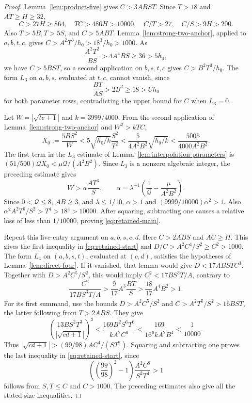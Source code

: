 \documentclass[12pt]{article}
\numberwithin{equation}{section}
\begin{document}
\begin{proof}
Lemma~\ref{lem:product-five} gives \(C>3ABST\). Since \(T>18\) and \(AT\ge H\ge32\),
\[
 C>27H\ge864,\quad TC>486H>10000,\quad
 C/T>27,\quad C/S>9H>200.
\]
Also \(T>5B,T>5S\), and \(C>5ABT\). Lemma~\ref{lem:strong-two-anchor},
applied to \(a,b,t,c\), gives \(C>A^2T^3/h_0>18^3/h_0>1000\).
As
\[
 \frac{A^2T^2}{BS}>4A^4BS\ge36>5h_0,
\]
we have \(C>5BST\), so a second application on \(b,s,t,c\) gives
\(C>B^2T^3/h_0\).
The form \(L_3\) on \(a,b,s\), evaluated at \(t,c\), cannot vanish, since
\[
 \frac{BT}{AS}>2B^2\ge18>Uh_0
\]
for both parameter rows, contradicting the upper bound for \(C\) when \(L_3=0\).

Let \(W=|\sqrt{tc+1}|\) and \(k=3999/4000\). From the second application of Lemma~\ref{lem:strong-two-anchor}
and \(W^2>kTC\),
\[
 X_0:=\frac{5BS^2}{W}
 <5\sqrt{h_0/k}\frac{S^2}{T^2}
 <\frac5{4A^2B^2}\sqrt{h_0/k}
 <\frac{5005}{4000A^2B^2}.
\]
The first term in the \(L_3\) estimate of
Lemma~\ref{lem:interpolation-parameters} is
\((51/500)\mathcal QX_0<\mu\mathcal Q/(A^2B^2)\).
Since \(L_3\) is a nonzero algebraic integer, the preceding estimate gives
\[
 W>\alpha\frac{AT^3}{S},\qquad
 \alpha=\lambda^{-1}\left(\frac1{\mathcal Q}
                              -\frac{\mu}{A^2B^2}\right).
\]
Since \(0<\mathcal Q\le8\), \(AB\ge3\), and \(\lambda\le1/10\),
\(\alpha>1\) and \((9999/10000)\alpha^2>1\).
Also \(\alpha^2A^2T^6/S^2>T^4>18^4>10000\).
After squaring, subtracting one causes a relative loss of less than \(1/10000\),
proving \eqref{eq:retained-main}.

Repeat this five-entry argument on \(a,b,s,c,d\). Here
\(C>2ABS\) and \(AC\ge H\). This gives the first inequality in
\eqref{eq:retained-start} and \(D/C>A^2C^4/S^2\ge C^2>1000\).
The form $L_4$ on $(a,b,s,t)$, evaluated at $(c,d)$, satisfies the hypotheses of Lemma~\ref{lem:direct-four}. If it vanished, that lemma would give $D<17ABSTC^3$. Together with $D>A^2C^5/S^2$, this would imply $C^2<17BS^3T/A$, contrary to
\[
 \frac{C^2}{17BS^3T/A}>
 \frac9{17}A^3\frac{BT}{S}>
 \frac{18}{17}A^4B^2>1.
\]
For its first summand, use the bounds \(D>A^2C^5/S^2\) and
\(C>A^2T^5/S^2>16BST\), the latter following from \(T>2ABS\).
They give
\[
 \left(\frac{13BS^2T^3}{|\sqrt{cd+1}|}\right)^2
 <\frac{169B^2S^6T^6}{kA^2C^6}
 <\frac{169}{16^6kA^2B^4}<\frac1{10000}.
\]
Thus \(|\sqrt{cd+1}|>(99/98)AC^4/(ST^2)\).
Squaring and subtracting one proves the last inequality in
\eqref{eq:retained-start}, since
\[
 \left(\left(\frac{99}{98}\right)^2-1\right)
       \frac{A^2C^8}{S^2T^4}>1
\]
follows from \(S,T\le C\) and \(C>1000\).
The preceding estimates also give all the stated size inequalities.
\end{proof}
\end{document}
